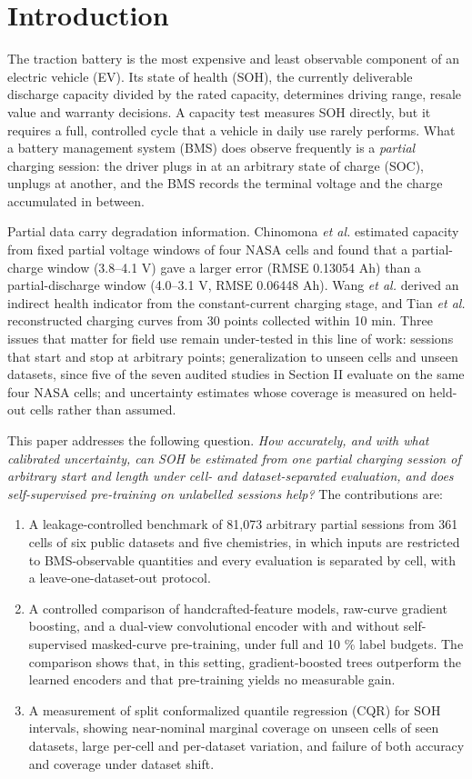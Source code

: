 \documentclass[journal]{IEEEtran}
\begin{document}
\section{Introduction}
The traction battery is the most expensive and least observable component of an electric vehicle (EV). Its state of health (SOH), the currently deliverable discharge capacity divided by the rated capacity, determines driving range, resale value and warranty decisions. A capacity test measures SOH directly, but it requires a full, controlled cycle that a vehicle in daily use rarely performs. What a battery management system (BMS) does observe frequently is a \emph{partial} charging session: the driver plugs in at an arbitrary state of charge (SOC), unplugs at another, and the BMS records the terminal voltage and the charge accumulated in between.

Partial data carry degradation information. Chinomona \emph{et al.} \cite{b1} estimated capacity from fixed partial voltage windows of four NASA cells and found that a partial-charge window (3.8--4.1 V) gave a larger error (RMSE 0.13054 Ah) than a partial-discharge window (4.0--3.1 V, RMSE 0.06448 Ah). Wang \emph{et al.} \cite{b7} derived an indirect health indicator from the constant-current charging stage, and Tian \emph{et al.} \cite{b13} reconstructed charging curves from 30 points collected within 10 min. Three issues that matter for field use remain under-tested in this line of work: sessions that start and stop at arbitrary points; generalization to unseen cells and unseen datasets, since five of the seven audited studies in Section II evaluate on the same four NASA cells; and uncertainty estimates whose coverage is measured on held-out cells rather than assumed.

This paper addresses the following question. \emph{How accurately, and with what calibrated uncertainty, can SOH be estimated from one partial charging session of arbitrary start and length under cell- and dataset-separated evaluation, and does self-supervised pre-training on unlabelled sessions help?} The contributions are:

\begin{enumerate}
\item A leakage-controlled benchmark of 81,073 arbitrary partial sessions from 361 cells of six public datasets and five chemistries, in which inputs are restricted to BMS-observable quantities and every evaluation is separated by cell, with a leave-one-dataset-out protocol.
\item A controlled comparison of handcrafted-feature models, raw-curve gradient boosting, and a dual-view convolutional encoder with and without self-supervised masked-curve pre-training, under full and 10 \% label budgets. The comparison shows that, in this setting, gradient-boosted trees outperform the learned encoders and that pre-training yields no measurable gain.
\item A measurement of split conformalized quantile regression (CQR) \cite{b17} for SOH intervals, showing near-nominal marginal coverage on unseen cells of seen datasets, large per-cell and per-dataset variation, and failure of both accuracy and coverage under dataset shift.
\end{enumerate}
\end{document}

